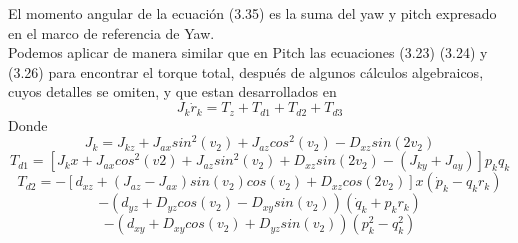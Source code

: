 El momento angular de la ecuación (3.35) es la suma del yaw y pitch expresado en el marco de
referencia de Yaw.\\
Podemos aplicar de manera similar que en Pitch las ecuaciones (3.23) (3.24) y (3.26) para
encontrar el torque total, después de algunos cálculos algebraicos, cuyos detalles se omiten,
y que estan desarrollados en \cite{Paper::Yoon2001}
\begin{equation}
	J_k\dot{r}_k = T_z + T_{d1} + T_{d2} + T_{d3}
\end{equation}
Donde
\begin{equation}
	J_k = J_{kz} + J_{ax}sin^2(v_2) + J_{az}cos^2(v_2)- D_{xz}
	sin(2v_2)
\end{equation}
\begin{equation}
	T_{d1} = [J_kx + J_{ax}cos^2(v2) + J_{az}sin^2(v_2) +
			D_{xz}sin(2v_2)-(J_{ky} + J_{ay})]p_kq_k
\end{equation}
\begin{equation}
	T_{d2} = -[d_{xz} + (J_{az} - J_{ax})sin(v_2)cos(v_2)+
	D_{xz}cos(2v_2)] x (\dot{p}_k - q_kr_k)
\end{equation}
\begin{equation}\nonumber
	-(d_{yz} + D_{yz}cos(v_2) - D_{xy}sin(v_2))(\dot{q}_k + p_kr_k)
\end{equation}
\begin{equation}\nonumber
	-(d_{xy} + D_{xy}cos(v_2) + D_{yz}sin(v_2))(p^2_k - q^2_k)
\end{equation}

